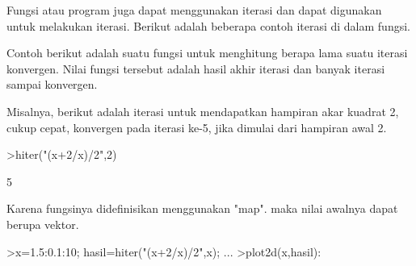 \documentclass{article}
\begin{document}
\begin{eulernotebook}
\begin{eulercomment}
\begin{eulercomment}
\begin{eulercomment}
\begin{eulercomment}
\begin{eulercomment}
\begin{eulercomment}
\begin{eulercomment}
\begin{eulercomment}
\begin{eulercomment}
\begin{eulercomment}
\begin{eulercomment}
\begin{eulercomment}
\begin{eulercomment}
\begin{eulercomment}
\begin{eulercomment}
\begin{eulercomment}
\begin{eulercomment}
\begin{eulercomment}
\begin{eulercomment}
\begin{eulercomment}
\begin{eulercomment}
\begin{eulercomment}
\begin{eulercomment}
\begin{eulercomment}
\begin{eulercomment}
\begin{eulercomment}
\begin{eulercomment}
\begin{eulercomment}
\begin{eulercomment}
\begin{eulercomment}
\begin{eulercomment}
\begin{eulercomment}
\begin{eulercomment}
\begin{eulercomment}
\begin{eulercomment}
\begin{eulercomment}
\begin{eulercomment}
Fungsi atau program juga dapat menggunakan iterasi dan dapat digunakan
untuk melakukan iterasi. Berikut adalah beberapa contoh iterasi di
dalam fungsi.

Contoh berikut adalah suatu fungsi untuk menghitung berapa lama suatu
iterasi konvergen. Nilai fungsi tersebut adalah hasil akhir iterasi
dan banyak iterasi sampai konvergen.
\end{eulercomment}
\begin{eulercomment}
Misalnya, berikut adalah iterasi untuk mendapatkan hampiran akar
kuadrat 2, cukup cepat, konvergen pada iterasi ke-5, jika dimulai dari
hampiran awal 2.
\end{eulercomment}
\begin{eulerprompt}
>hiter("(x+2/x)/2",2)
\end{eulerprompt}
\begin{euleroutput}
  5
\end{euleroutput}
\begin{eulercomment}
Karena fungsinya didefinisikan menggunakan "map". maka nilai awalnya
dapat berupa vektor.
\end{eulercomment}
\begin{eulerprompt}
>x=1.5:0.1:10; hasil=hiter("(x+2/x)/2",x); ...
>plot2d(x,hasil):
\end{eulerprompt}

\end{eulercomment}
\end{eulercomment}
\end{eulercomment}
\end{eulercomment}
\end{eulercomment}
\end{eulercomment}
\end{eulercomment}
\end{eulercomment}
\end{eulercomment}
\end{eulercomment}
\end{eulercomment}
\end{eulercomment}
\end{eulercomment}
\end{eulercomment}
\end{eulercomment}
\end{eulercomment}
\end{eulercomment}
\end{eulercomment}
\end{eulercomment}
\end{eulercomment}
\end{eulercomment}
\end{eulercomment}
\end{eulercomment}
\end{eulercomment}
\end{eulercomment}
\end{eulercomment}
\end{eulercomment}
\end{eulercomment}
\end{eulercomment}
\end{eulercomment}
\end{eulercomment}
\end{eulercomment}
\end{eulercomment}
\end{eulercomment}
\end{eulercomment}
\end{eulercomment}
\end{eulernotebook}
\end{document}
